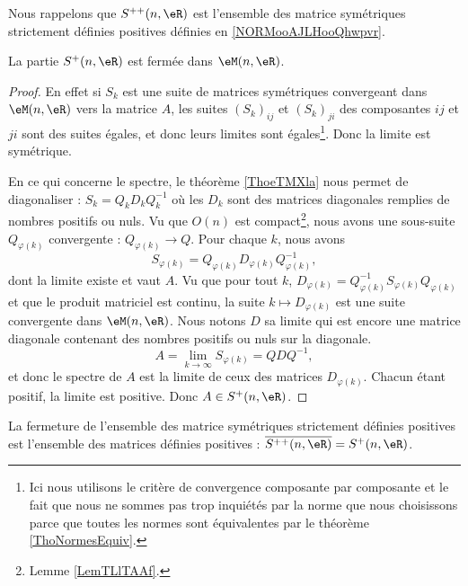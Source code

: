 Nous rappelons que \( S^{++}(n,\eR)\) est l'ensemble des matrice symétriques strictement définies positives définies en \ref{NORMooAJLHooQhwpvr}.

\begin{lemma}   \label{LemMGUSooPqjguE}
    La partie \( S^+(n,\eR)\) est fermée dans \( \eM(n,\eR)\).
\end{lemma}

\begin{proof}
    En effet si \( S_k\) est une suite de matrices symétriques convergeant dans \( \eM(n,\eR)\) vers la matrice \( A\), les suites \( (S_k)_{ij}\) et \( (S_k)_{ji}\) des composantes \( ij\) et \( ji\) sont des suites égales, et donc leurs limites sont égales\footnote{Ici nous utilisons le critère de convergence composante par composante et le fait que nous ne sommes pas trop inquiétés par la norme que nous choisissons parce que toutes les normes sont équivalentes par le théorème \ref{ThoNormesEquiv}.}. Donc la limite est symétrique.

    En ce qui concerne le spectre, le théorème \ref{ThoeTMXla} nous permet de diagonaliser : \( S_k=Q_kD_kQ_k^{-1}\) où les \( D_k\) sont des matrices diagonales remplies de nombres positifs ou nuls. Vu que \( O(n)\) est compact\footnote{Lemme \ref{LemTLlTAAf}.}, nous avons une sous-suite \( Q_{\varphi(k)}\) convergente : \( Q_{\varphi(k)}\to Q\). Pour chaque \( k\), nous avons
    \begin{equation}
        S_{\varphi(k)}=Q_{\varphi(k)}D_{\varphi(k)}Q^{-1}_{\varphi(k)},
    \end{equation}
    dont la limite existe et vaut \( A\). Vu que pour tout \( k\), \( D_{\varphi(k)}=Q^{-1}_{\varphi(k)}S_{\varphi(k)}Q_{\varphi(k)}\) et que le produit matriciel est continu, la suite \( k\mapsto D_{\varphi(k)}\) est une suite convergente dans \( \eM(n,\eR)\). Nous notons \( D\) sa limite qui est encore une matrice diagonale contenant des nombres positifs ou nuls sur la diagonale.
    \begin{equation}
        A=\lim_{k\to \infty } S_{\varphi(k)}=QDQ^{-1},
    \end{equation}
    et donc le spectre de \( A\) est la limite de ceux des matrices \( D_{\varphi(k)}\). Chacun étant positif, la limite est positive. Donc \( A\in S^+(n,\eR)\).
\end{proof}

\begin{lemma}   \label{LemZKJWqIP}
    La fermeture de l'ensemble des matrice symétriques strictement définies positives est l'ensemble des matrices définies positives : \( \overline{ S^{++}(n,\eR) }=S^+(n,\eR)\).
\end{lemma}

